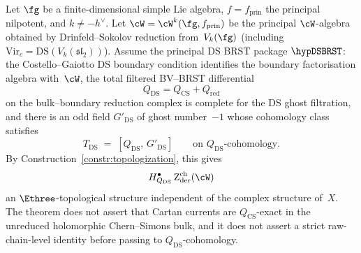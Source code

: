 \begin{theorem}
\label{thm:E3-topological-DS}
\label{conj:E3-topological-DS}%
Let $\fg$ be a finite-dimensional simple Lie algebra,
$f = f_{\mathrm{prin}}$ the principal nilpotent, and
$k \ne -h^\vee$. Let $\cW = \cW^k(\fg, f_{\mathrm{prin}})$ be
the principal $\cW$-algebra obtained by Drinfeld--Sokolov
reduction from~$V_k(\fg)$ \textup{(}including
$\mathrm{Vir}_c = \mathrm{DS}(V_k(\mathfrak{sl}_2))$\textup{)}.
Assume the principal DS BRST package \(\hypDSBRST\): the
Costello--Gaiotto DS boundary condition identifies the boundary
factorisation algebra with~\(\cW\), the total filtered BV--BRST
differential
\[
 Q_{\mathrm{DS}}=Q_{\mathrm{CS}}+Q_{\mathrm{red}}
\]
on the bulk--boundary reduction complex is complete for the DS ghost
filtration, and there is an odd field \(G'_{\mathrm{DS}}\) of ghost
number~\(-1\) whose cohomology class satisfies
\begin{equation}\label{eq:T-DS-BRST}
T_{\mathrm{DS}} \;=\; [Q_{\mathrm{DS}},\, G'_{\mathrm{DS}}]\qquad
\text{on $Q_{\mathrm{DS}}$-cohomology.}
\end{equation}
By Construction~\textup{\ref{constr:topologization}},
this gives
\[
H_{Q_{\mathrm{DS}}}^\bullet\Zder^{\mathrm{ch}}(\cW)
\]
an
$\Ethree$-topological structure independent of the complex
structure of~$X$. The theorem does not assert that Cartan currents are
\(Q_{\mathrm{CS}}\)-exact in the unreduced holomorphic
Chern--Simons bulk, and it does not assert a strict raw-chain-level
identity before passing to \(Q_{\mathrm{DS}}\)-cohomology.
\end{theorem}


